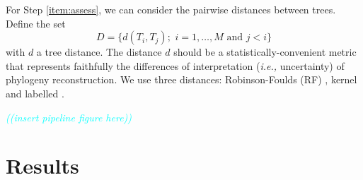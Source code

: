 \documentclass[10pt]{article}
\newcommand{\comment}[1]{\textsl{\textcolor{cyan}{((#1))}}}
\newcommand{\ie}{\textit{i.e.,}\xspace}
\begin{document}
For Step \ref{item:assess}, we can consider the pairwise distances between trees. 
Define the set $$D = \{d(T_i,T_j);\,\, i=1,\ldots, M \text{ and } j<i \}$$ with $d$ a tree distance. 
The distance $d$ should be a statistically-convenient metric that represents faithfully the differences of interpretation (\ie uncertainty) of phylogeny reconstruction. 
We use three distances:  Robinson-Foulds (RF) \cite{Robinson:1981}, kernel \cite{Poon:2013} and labelled \cite{xxx}. 

\comment{insert pipeline figure here}






\section{Results}

\newpage

\end{document}
